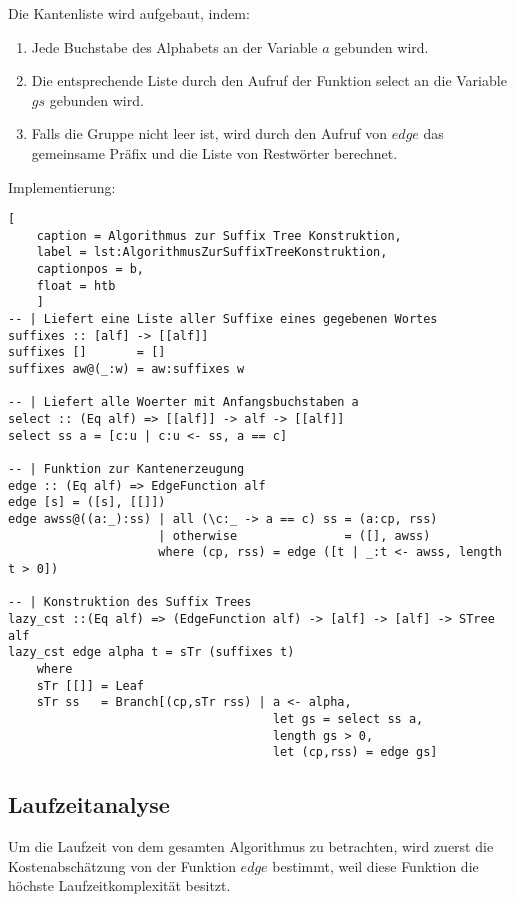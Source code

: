 \documentclass[12pt]{report}
\begin{document}
Die Kantenliste wird aufgebaut, indem:
\begin{enumerate}
    \item Jede Buchstabe des Alphabets an der Variable $a$ gebunden wird.
    \item Die entsprechende Liste durch den Aufruf der Funktion select an die Variable $gs$ gebunden wird.
    \item Falls die Gruppe nicht leer ist, wird durch den Aufruf von $edge$ das gemeinsame Präfix und die Liste von Restwörter berechnet.
\end{enumerate}
Implementierung:
\begin{lstlisting}[
    caption = Algorithmus zur Suffix Tree Konstruktion,
    label = lst:AlgorithmusZurSuffixTreeKonstruktion,
    captionpos = b,
    float = htb
    ]
-- | Liefert eine Liste aller Suffixe eines gegebenen Wortes
suffixes :: [alf] -> [[alf]]
suffixes []       = []
suffixes aw@(_:w) = aw:suffixes w

-- | Liefert alle Woerter mit Anfangsbuchstaben a
select :: (Eq alf) => [[alf]] -> alf -> [[alf]]
select ss a = [c:u | c:u <- ss, a == c]

-- | Funktion zur Kantenerzeugung
edge :: (Eq alf) => EdgeFunction alf
edge [s] = ([s], [[]])
edge awss@((a:_):ss) | all (\c:_ -> a == c) ss = (a:cp, rss)
                     | otherwise               = ([], awss)
                     where (cp, rss) = edge ([t | _:t <- awss, length t > 0])

-- | Konstruktion des Suffix Trees
lazy_cst ::(Eq alf) => (EdgeFunction alf) -> [alf] -> [alf] -> STree alf
lazy_cst edge alpha t = sTr (suffixes t)
    where
    sTr [[]] = Leaf
    sTr ss   = Branch[(cp,sTr rss) | a <- alpha,
                                     let gs = select ss a,
                                     length gs > 0,
                                     let (cp,rss) = edge gs]
\end{lstlisting}

\subsection{Laufzeitanalyse}
\label{sec:Laufzeitanalyse}

Um die Laufzeit von dem gesamten Algorithmus zu betrachten, wird zuerst die Kostenabschätzung von der Funktion $edge$ bestimmt, weil diese Funktion die höchste Laufzeitkomplexität besitzt.
\end{document}
